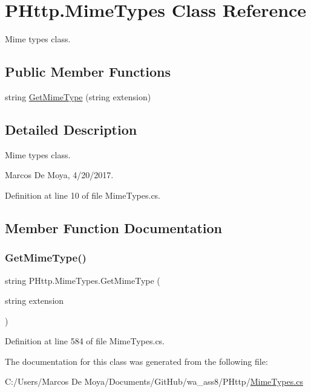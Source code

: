 \hypertarget{class_p_http_1_1_mime_types}{}\section{P\+Http.\+Mime\+Types Class Reference}
\label{class_p_http_1_1_mime_types}


Mime types class.  


\subsection*{Public Member Functions}
\begin{DoxyCompactItemize}
\item 
string \hyperlink{class_p_http_1_1_mime_types_a26d789f5085708710c57fba028f8df02}{Get\+Mime\+Type} (string extension)
\end{DoxyCompactItemize}


\subsection{Detailed Description}
Mime types class. 

Marcos De Moya, 4/20/2017. 

Definition at line 10 of file Mime\+Types.\+cs.



\subsection{Member Function Documentation}
\mbox{\label{class_p_http_1_1_mime_types_a26d789f5085708710c57fba028f8df02}} 
\subsubsection{\texorpdfstring{Get\+Mime\+Type()}{GetMimeType()}}
{\footnotesize\ttfamily string P\+Http.\+Mime\+Types.\+Get\+Mime\+Type (\begin{DoxyParamCaption}\item[{string}]{extension }\end{DoxyParamCaption})}



Definition at line 584 of file Mime\+Types.\+cs.



The documentation for this class was generated from the following file\+:\begin{DoxyCompactItemize}
\item 
C\+:/\+Users/\+Marcos De Moya/\+Documents/\+Git\+Hub/wa\+\_\+ass8/\+P\+Http/\hyperlink{_mime_types_8cs}{Mime\+Types.\+cs}\end{DoxyCompactItemize}
